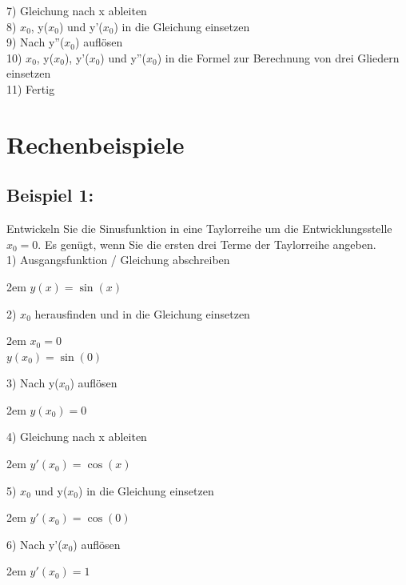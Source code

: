 \documentclass[11pt,final]{scrreprt}
\newcommand{\br} {\medskip\\}
\begin{document}
7) Gleichung nach x ableiten\\
8) $x_0$, y($x_0$) und y'($x_0$) in die Gleichung einsetzen\\
9) Nach y''($x_0$) auflösen\br

10) $x_0$, y($x_0$), y'($x_0$) und y''($x_0$) in die Formel zur Berechnung von drei Gliedern einsetzen\\
11)  Fertig\\
\par	
\endgroup 

\newpage
\section{Rechenbeispiele}

\subsection*{Beispiel 1:}

Entwickeln Sie die Sinusfunktion in eine Taylorreihe um die Entwicklungsstelle $x_0=0$. Es genügt, wenn Sie die ersten drei Terme der Taylorreihe angeben.\br

1) Ausgangsfunktion / Gleichung abschreiben

\begingroup
\leftskip2em 
$ y(x) = \sin(x)$
\par	
\endgroup 

2) $x_0$ herausfinden und in die Gleichung einsetzen

\begingroup
\leftskip2em 
$x_0 = 0$\\
$y(x_0) = \sin(0)$
\par	
\endgroup 

3) Nach y($x_0$) auflösen

\begingroup
\leftskip2em 
$y(x_0) = 0$\\
\par	
\endgroup 

4) Gleichung nach x ableiten

\begingroup
\leftskip2em 
$ y'(x_0) = \cos(x) $
\par	
\endgroup 

5) $x_0$ und y($x_0$) in die Gleichung einsetzen

\begingroup
\leftskip2em 
$ y'(x_0) = \cos(0) $
\par	
\endgroup 

6) Nach y'($x_0$) auflösen

\begingroup
\leftskip2em 
$ y'(x_0)=1 $\\
\par	
\endgroup 
\end{document}
